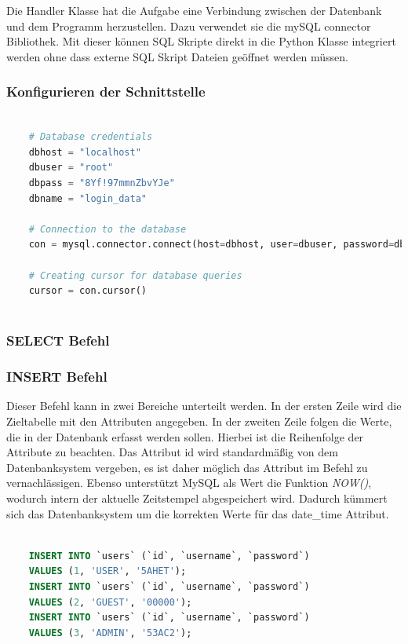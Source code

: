 Die Handler Klasse hat die Aufgabe eine Verbindung zwischen der Datenbank und dem Programm herzustellen. Dazu verwendet sie die mySQL connector Bibliothek. Mit dieser können SQL Skripte direkt in die Python Klasse integriert werden ohne dass externe SQL Skript Dateien geöffnet werden müssen. 

\subsubsection{Konfigurieren der Schnittstelle}

\begin{lstlisting}[language=Python, caption={Konfiguration der Datenbankschnittstelle},captionpos=b]
	
	# Database credentials
	dbhost = "localhost"
	dbuser = "root"
	dbpass = "8Yf!97mmnZbvYJe"
	dbname = "login_data"
	
	# Connection to the database
	con = mysql.connector.connect(host=dbhost, user=dbuser, password=dbpass, database=dbname)
	
	# Creating cursor for database queries
	cursor = con.cursor()
	
\end{lstlisting}


\subsubsection{SELECT Befehl}

\subsubsection{INSERT Befehl}

Dieser Befehl kann in zwei Bereiche unterteilt werden. In der ersten Zeile wird die
Zieltabelle mit den Attributen angegeben. In der zweiten Zeile folgen die Werte, die in der Datenbank erfasst werden sollen. Hierbei ist die Reihenfolge der Attribute zu beachten. Das Attribut id wird standardmäßig von dem Datenbanksystem vergeben, es ist daher möglich das Attribut im Befehl zu vernachlässigen. Ebenso unterstützt MySQL als Wert die Funktion \textit{NOW()}, wodurch intern der aktuelle Zeitstempel abgespeichert wird. Dadurch kümmert sich das Datenbanksystem um die korrekten Werte für das date\_time Attribut.

\begin{lstlisting}[language=SQL, caption={Konfiguration der Datenbankschnittstelle},captionpos=b]
	
	INSERT INTO `users` (`id`, `username`, `password`)
	VALUES (1, 'USER', '5AHET');
	INSERT INTO `users` (`id`, `username`, `password`)
	VALUES (2, 'GUEST', '00000');
	INSERT INTO `users` (`id`, `username`, `password`)
	VALUES (3, 'ADMIN', '53AC2');
	
\end{lstlisting}

\newpage